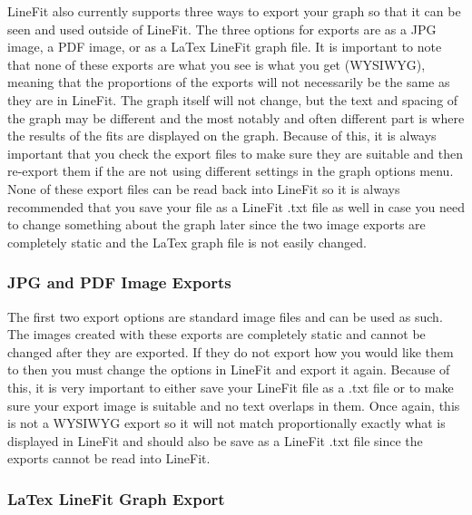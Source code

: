 \documentclass[titlepage,12pt]{article}
\begin{document}
LineFit also currently supports three ways to export your graph so that it can be seen and used outside of LineFit. The three options for exports are as a JPG image, a PDF image, or as a LaTex LineFit graph file. It is important to note that none of these exports are what you see is what you get (WYSIWYG), meaning that the proportions of the exports will not necessarily be the same as they are in LineFit. The graph itself will not change, but the text and spacing of the graph may be different and the most notably and often different part is where the results of the fits are displayed on the graph. Because of this, it is always important that you check the export files to make sure they are suitable and then re-export them if the are not using different settings in the graph options menu. None of these export files can be read back into LineFit so it is always recommended that you save your file as a LineFit .txt file as well in case you need to change something about the graph later since the two image exports are completely static and the LaTex graph file is not easily changed.



\subsubsection{JPG and PDF Image Exports}
\label{sec:exportjpg}
\label{sec:exportpdf}

The first two export options are standard image files and can be used as such. The images created with these exports are completely static and cannot be changed after they are exported. If they do not export how you would like them to then you must change the options in LineFit and export it again. Because of this, it is very important to either save your LineFit file as a .txt file or to make sure your export image is suitable and no text overlaps in them. Once again, this is not a WYSIWYG export so it will not match proportionally exactly what is displayed in LineFit and should also be save as a LineFit .txt file since the exports cannot be read into LineFit.



\subsubsection{LaTex LineFit Graph Export}
\label{sec:exportlatex}
\end{document}
